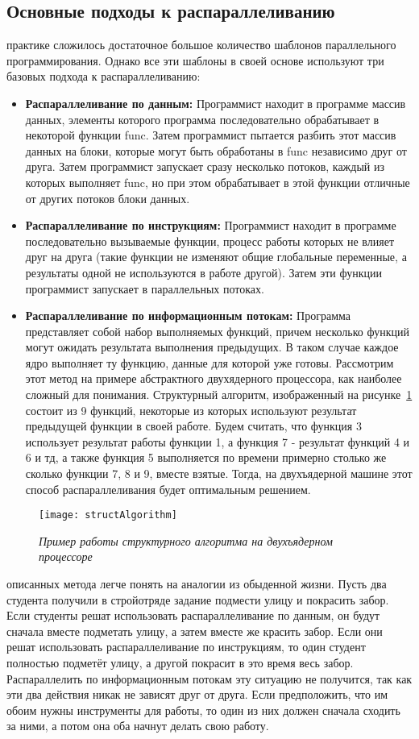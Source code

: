 { %
	\subsection{Основные подходы к распараллеливанию}
	 практике сложилось достаточное большое количество шаблонов параллельного программирования. Однако все эти шаблоны в своей основе используют три базовых подхода к распараллеливанию:
	\begin{itemize}
		\item\textbf{Распараллеливание по данным:} Программист находит в программе массив данных, элементы которого программа последовательно обрабатывает в некоторой функции func. Затем программист пытается разбить этот массив данных на блоки, которые могут быть обработаны в func независимо друг от друга. Затем программист запускает сразу несколько потоков, каждый из которых выполняет func, но при этом обрабатывает в этой функции отличные от других потоков блоки данных.
		\item\textbf{Распараллеливание по инструкциям:} Программист находит в программе последовательно вызываемые функции, процесс работы которых не влияет друг на друга (такие функции не изменяют общие глобальные переменные, а результаты одной не используются в работе другой). Затем эти функции программист запускает в параллельных потоках.
		\item\textbf{Распараллеливание по информационным потокам:} Программа представляет собой набор выполняемых функций, причем несколько функций могут ожидать результата выполнения предыдущих. В таком случае каждое ядро выполняет ту функцию, данные для которой уже готовы. Рассмотрим этот метод на примере абстрактного двухядерного процессора, как наиболее сложный для понимания. Структурный алгоритм, изображенный на рисунке~\ref{structAlgorithm:image} состоит из 9 функций, некоторые из которых используют результат предыдущей функции в своей работе. Будем считать, что функция 3 использует результат работы функции 1, а функция 7 - результат функций 4 и 6 и тд, а также функция 5 выполняется по времени примерно столько же сколько функции 7, 8 и 9, вместе взятые. Тогда, на двухъядерной машине этот способ распараллеливания будет оптимальным решением.
	\end{itemize}
	\begin{figure}[H]
		\texttt{[image: structAlgorithm]}
		\caption{\textit{Пример работы структурного алгоритма на двухъядерном процессоре}}
		\label{structAlgorithm:image}
	\end{figure}
	 описанных метода легче понять на аналогии из обыденной жизни. Пусть два студента получили в стройотряде задание подмести улицу и покрасить забор. Если студенты решат использовать распараллеливание по данным, он будут сначала вместе подметать улицу, а затем вместе же красить забор. Если они решат использовать распараллеливание по инструкциям, то один студент полностью подметёт улицу, а другой покрасит в это время весь забор. Распараллелить по информационным потокам эту ситуацию не получится, так как эти два действия никак не зависят друг от друга. Если предположить, что им обоим нужны инструменты для работы, то один из них должен сначала сходить за ними, а потом она оба начнут делать свою работу.
}
